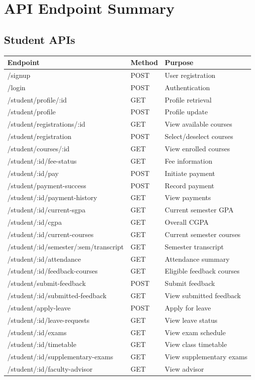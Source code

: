 \documentclass[12pt]{article}
\begin{document}
\newpage

\section{API Endpoint Summary}

\subsection{Student APIs}

\begin{table}[H]
\centering
\small
\begin{tabular}{|p{4cm}|p{2cm}|p{5cm}|}
\hline
\textbf{Endpoint} & \textbf{Method} & \textbf{Purpose} \\
\hline
/signup & POST & User registration \\
/login & POST & Authentication \\
/student/profile/:id & GET & Profile retrieval \\
/student/profile & POST & Profile update \\
/student/registrations/:id & GET & View available courses \\
/student/registration & POST & Select/deselect courses \\
/student/courses/:id & GET & View enrolled courses \\
/student/:id/fee-status & GET & Fee information \\
/student/:id/pay & POST & Initiate payment \\
/student/payment-success & POST & Record payment \\
/student/:id/payment-history & GET & View payments \\
/student/:id/current-sgpa & GET & Current semester GPA \\
/student/:id/cgpa & GET & Overall CGPA \\
/student/:id/current-courses & GET & Current semester courses \\
/student/:id/semester/:sem/transcript & GET & Semester transcript \\
/student/:id/attendance & GET & Attendance summary \\
/student/:id/feedback-courses & GET & Eligible feedback courses \\
/student/submit-feedback & POST & Submit feedback \\
/student/:id/submitted-feedback & GET & View submitted feedback \\
/student/apply-leave & POST & Apply for leave \\
/student/:id/leave-requests & GET & View leave status \\
/student/:id/exams & GET & View exam schedule \\
/student/:id/timetable & GET & View class timetable \\
/student/:id/supplementary-exams & GET & View supplementary exams \\
/student/:id/faculty-advisor & GET & View advisor \\
\hline
\end{tabular}
\end{table}
\end{document}
